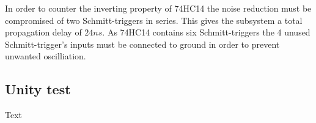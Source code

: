 In order to counter the inverting property of 74HC14 the noise reduction must be compromised of two Schmitt-triggers in series. This gives the subsystem a total propagation delay of $24 ns$. As 74HC14 contains six Schmitt-triggers the 4 unused Schmitt-trigger's inputs must be connected to ground in order to prevent unwanted oscilliation.

\subsection{Unity test}
Text